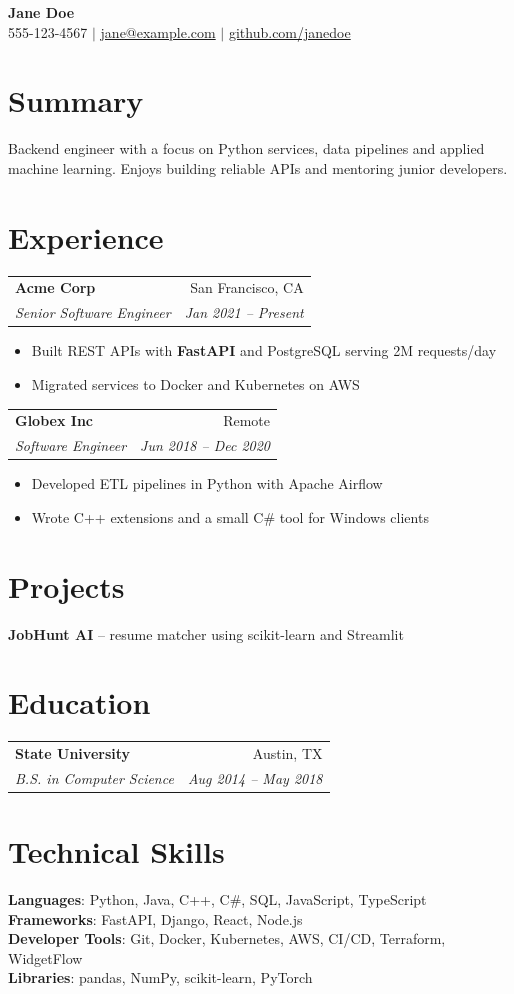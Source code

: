 \documentclass[letterpaper,11pt]{article}
\makeatletter
\newcommand{\resumeItem}[1]{\item\small{{#1 \vspace{-2pt}}}}
\newcommand{\resumeSubheading}[4]{
  \vspace{-2pt}\item
    \begin{tabular*}{0.97\textwidth}[t]{l@{\extracolsep{\fill}}r}
      \textbf{#1} & #2 \\
      \textit{\small#3} & \textit{\small #4} \\
    \end{tabular*}\vspace{-7pt}
}
\newcommand{\resumeItemListStart}{\begin{itemize}}
\newcommand{\resumeItemListEnd}{\end{itemize}\vspace{-5pt}}
\makeatother
\begin{document}
\begin{center}
    \textbf{\Huge Jane Doe} \\
    \small 555-123-4567 $|$ \href{mailto:jane@example.com}{jane@example.com} $|$
    \href{https://github.com/janedoe}{github.com/janedoe}
\end{center}

\section{Summary}
Backend engineer with a focus on Python services, data pipelines and applied machine learning.
Enjoys building reliable APIs and mentoring junior developers.

\section{Experience}
  \resumeSubHeadingListStart
    \resumeSubheading
      {Acme Corp}{San Francisco, CA}
      {Senior Software Engineer}{Jan 2021 -- Present}
      \resumeItemListStart
        \resumeItem{Built REST APIs with \textbf{FastAPI} and PostgreSQL serving 2M requests/day}
        \resumeItem{Migrated services to Docker and Kubernetes on AWS}
      \resumeItemListEnd

    \resumeSubheading
      {Globex Inc}{Remote}
      {Software Engineer}{Jun 2018 -- Dec 2020}
      \resumeItemListStart
        \resumeItem{Developed ETL pipelines in Python with Apache Airflow}
        \resumeItem{Wrote C++ extensions and a small C\# tool for Windows clients}
      \resumeItemListEnd
  \resumeSubHeadingListEnd

\section{Projects}
  \resumeItem{\textbf{JobHunt AI} -- resume matcher using scikit-learn and Streamlit}

\section{Education}
  \resumeSubheading
    {State University}{Austin, TX}
    {B.S. in Computer Science}{Aug 2014 -- May 2018}

\section{Technical Skills}
 \begin{itemize}
    \small{\item{
     \textbf{Languages}{: Python, Java, C++, C\#, SQL, JavaScript, TypeScript} \\
     \textbf{Frameworks}{: FastAPI, Django, React, Node.js} \\
     \textbf{Developer Tools}{: Git, Docker, Kubernetes, AWS, CI/CD, Terraform, WidgetFlow} \\
     \textbf{Libraries}{: pandas, NumPy, scikit-learn, PyTorch}
    }}
 \end{itemize}
\end{document}
